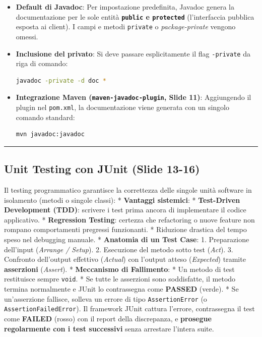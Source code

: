 \documentclass[11pt,a4paper,oneside]{report}
\newcommand{\passthrough}[1]{#1}
\begin{document}
\begin{itemize}
\item
  \textbf{Default di Javadoc}: Per impostazione predefinita, Javadoc
  genera la documentazione per le sole entità
  \textbf{\passthrough{\lstinline!public!} e
  \passthrough{\lstinline!protected!}} (l'interfaccia pubblica esposta
  ai client). I campi e metodi \passthrough{\lstinline!private!} o
  \emph{package-private} vengono omessi.
\item
  \textbf{Inclusione del privato}: Si deve passare esplicitamente il
  flag \passthrough{\lstinline!-private!} da riga di comando:

\begin{lstlisting}[language=bash]
javadoc -private -d doc *
\end{lstlisting}
\item
  \textbf{Integrazione Maven
  (\passthrough{\lstinline!maven-javadoc-plugin!}, Slide 11)}:
  Aggiungendo il plugin nel \passthrough{\lstinline!pom.xml!}, la
  documentazione viene generata con un singolo comando standard:

\begin{lstlisting}[language=bash]
mvn javadoc:javadoc
\end{lstlisting}
\end{itemize}

\begin{center}\rule{0.5\linewidth}{0.5pt}\end{center}

\subsection{Unit Testing con JUnit (Slide
13-16)}\label{chap18_unit-testing-con-junit-slide-13-16}

Il testing programmatico garantisce la correttezza delle singole unità
software in isolamento (metodi o singole classi): * \textbf{Vantaggi
sistemici}: * \textbf{Test-Driven Development (TDD)}: scrivere i test
prima ancora di implementare il codice applicativo. * \textbf{Regression
Testing}: certezza che refactoring o nuove feature non rompano
comportamenti pregressi funzionanti. * Riduzione drastica del tempo
speso nel debugging manuale. * \textbf{Anatomia di un Test Case}: 1.
Preparazione dell'input (\emph{Arrange / Setup}). 2. Esecuzione del
metodo sotto test (\emph{Act}). 3. Confronto dell'output effettivo
(\emph{Actual}) con l'output atteso (\emph{Expected}) tramite
\textbf{asserzioni} (\emph{Assert}). * \textbf{Meccanismo di
Fallimento}: * Un metodo di test restituisce sempre
\passthrough{\lstinline!void!}. * Se tutte le asserzioni sono
soddisfatte, il metodo termina normalmente e JUnit lo contrassegna come
\textbf{PASSED} (verde). * Se un'asserzione fallisce, solleva un errore
di tipo \passthrough{\lstinline!AssertionError!} (o
\passthrough{\lstinline!AssertionFailedError!}). Il framework JUnit
cattura l'errore, contrassegna il test come \textbf{FAILED} (rosso) con
il report della discrepanza, e \textbf{prosegue regolarmente con i test
successivi} senza arrestare l'intera suite.
\end{document}
